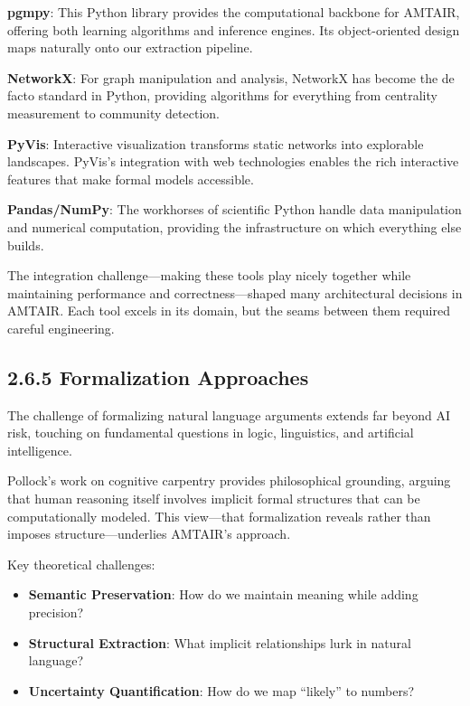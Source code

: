 \documentclass[
  11pt,
  letterpaper,
  openany]{book}
\providecommand{\tightlist}{%
  \setlength{\itemsep}{0pt}\setlength{\parskip}{0pt}}
\begin{document}
\textbf{pgmpy}: This Python library provides the computational backbone
for AMTAIR, offering both learning algorithms and inference engines. Its
object-oriented design maps naturally onto our extraction pipeline.

\textbf{NetworkX}: For graph manipulation and analysis, NetworkX has
become the de facto standard in Python, providing algorithms for
everything from centrality measurement to community detection.

\textbf{PyVis}: Interactive visualization transforms static networks
into explorable landscapes. PyVis's integration with web technologies
enables the rich interactive features that make formal models
accessible.

\textbf{Pandas/NumPy}: The workhorses of scientific Python handle data
manipulation and numerical computation, providing the infrastructure on
which everything else builds.

The integration challenge---making these tools play nicely together
while maintaining performance and correctness---shaped many
architectural decisions in AMTAIR. Each tool excels in its domain, but
the seams between them required careful engineering.

\subsection{2.6.5 Formalization Approaches}\label{sec-formalization}

The challenge of formalizing natural language arguments extends far
beyond AI risk, touching on fundamental questions in logic, linguistics,
and artificial intelligence.

Pollock's work on cognitive carpentry \textcite{pollock1995} provides
philosophical grounding, arguing that human reasoning itself involves
implicit formal structures that can be computationally modeled. This
view---that formalization reveals rather than imposes
structure---underlies AMTAIR's approach.

Key theoretical challenges:

\begin{itemize}
\tightlist
\item
  \textbf{Semantic Preservation}: How do we maintain meaning while
  adding precision?
\item
  \textbf{Structural Extraction}: What implicit relationships lurk in
  natural language?
\item
  \textbf{Uncertainty Quantification}: How do we map ``likely'' to
  numbers?
\end{itemize}
\end{document}
